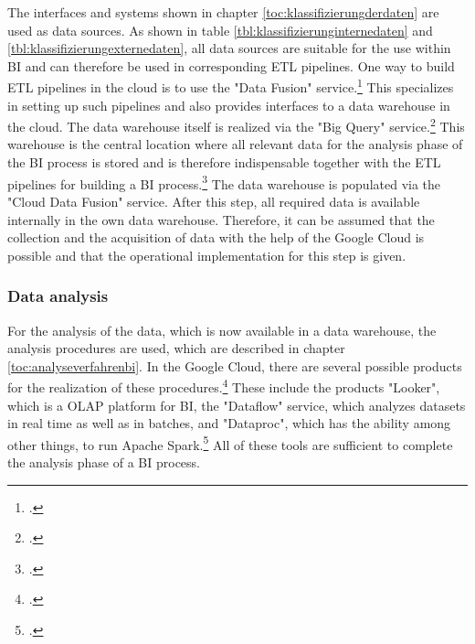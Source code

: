 The interfaces and systems shown in chapter \ref{toc:klassifizierungderdaten} are used as data sources.
As shown in table \ref{tbl:klassifizierunginternedaten} and \ref{tbl:klassifizierungexternedaten}, all data sources are suitable for the
use within \ac{BI} and can therefore be used in corresponding \ac{ETL} pipelines.
One way to build \ac{ETL} pipelines in the cloud is to use the "Data Fusion"
service.\footcite[Cf.][]{googlecloud2021dw} This specializes in setting up such pipelines and also provides interfaces
to a data warehouse in the cloud. The data warehouse itself is realized via the "Big Query" service.\footcite[Cf.][]{googlecloud2021dw}
This warehouse is the central location where all relevant data for the analysis phase of the \ac{BI} process is stored and
is therefore indispensable together with the \ac{ETL} pipelines for building a \ac{BI} process.\footcite[Cf.][pp. 105]{loshin2012business}
The data warehouse is populated via the "Cloud Data Fusion" service. After this step, all required data is available internally
in the own data warehouse. Therefore, it can be assumed
that the collection and the acquisition of data with the help of the Google Cloud is possible and that the operational implementation for this step is given.

\subsubsection{Data analysis} \label{toc:datenanalyse}

For the analysis of the data, which is now available in a data warehouse, the analysis procedures are used, which are described in
chapter \ref{toc:analyseverfahrenbi}. In the Google Cloud, there are several possible products for the realization of these procedures.\footcite[Cf.][]{googlecloud2021dw}
These include the products "Looker", which is a \ac{OLAP} platform for \ac{BI},
the "Dataflow" service, which analyzes datasets in real time as well as in batches, and "Dataproc", which has the ability
among other things, to run Apache Spark.\footcite[Cf.][]{googlecloud2021dw} All of these tools are sufficient to complete the analysis phase
of a \ac{BI} process. 

